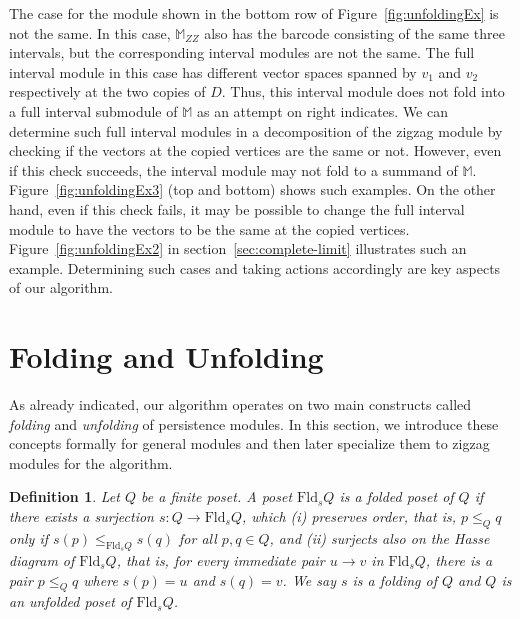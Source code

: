 \documentclass[11pt]{article}
\theoremstyle{plain}%
\newtheorem{definition}{Definition}[section]
\newtheorem{remark}{Remark}[section]
\newcommand{\M}{\mathbb{M}}
\newcommand{\Fld}{\mathrm{Fld}}
\newcommand{\tamal}[1]		{{ \textcolor{darkblue} { #1}}}
\begin{document}
The case for the module shown in the bottom row of Figure~\ref{fig:unfoldingEx} is not the same.
In this case, $\M_{ZZ}$ also has the barcode consisting of the same three intervals, but the corresponding interval
modules are not the same. The full interval module in this case has different vector spaces spanned by $v_1$ and $v_2$ respectively 
at the two copies of $D$. Thus, this interval module does not fold into a full interval submodule of $\M$ as an attempt on right indicates. We can determine such full interval modules
in a decomposition of the zigzag module by checking if the vectors at the copied vertices
are the same or not. However, even if this check succeeds, the interval module
may not fold to a summand of $\M$. Figure~\ref{fig:unfoldingEx3} (top and bottom) shows
such examples. On the other hand, 
even if this check fails, it may be possible to change
the full interval module to have the vectors to be the same
at the copied vertices. Figure~\ref{fig:unfoldingEx2} in section~\ref{sec:complete-limit} illustrates such an example. Determining
such cases and taking actions accordingly are key aspects of our algorithm.

\section{Folding and Unfolding}
\label{sec:folding-unfolding}
As already indicated, our algorithm operates on two 
main constructs called \emph{folding} and \emph{unfolding} of persistence
modules. In this section, we introduce these concepts formally for
general modules and then later specialize them to zigzag modules for the algorithm.

\begin{definition}
Let $Q$ be a finite poset. A poset $\Fld_s Q$ is a \emph{folded} poset of
$Q$ if there exists a surjection $s: Q\rightarrow \Fld_s Q$, which
(i) preserves order, that is, $p\leq_Q q$ only if $s(p)\leq_{\Fld_s Q} s(q)$ for all $p,q \in Q$, and (ii) surjects also on the Hasse diagram of $\Fld_s Q$, that is, for every immediate pair $u\rightarrow v$ in $\Fld_s Q$, there is a pair $p\leq_Q q$ where $s(p)=u$ and $s(q)=v$. We say $s$ is a folding of
$Q$ and $Q$ is an \emph{unfolded} poset of $\Fld_s Q$.
\end{definition}
\end{document}
